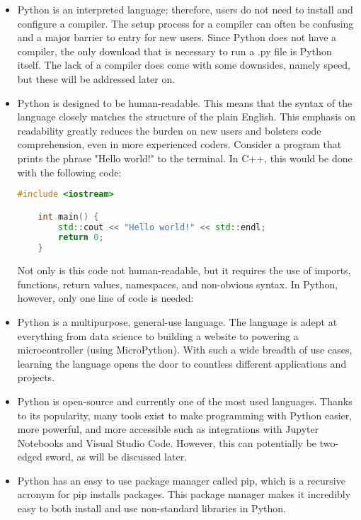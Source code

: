 \begin{itemize}
    \item Python is an interpreted language; therefore, users do not need to install and configure
    a compiler. The setup process for a compiler can often be confusing and a major barrier to entry
    for new users. Since Python does not have a compiler, the only download that is necessary to run 
    a .py file is Python itself. The lack of a compiler does come with some downsides, namely speed,
    but these will be addressed later on.
    \item Python is designed to be human-readable. This means that the syntax of the language closely
    matches the structure of the plain English. This emphasis on readability greatly reduces the
    burden on new users and bolsters code comprehension, even in more experienced coders. Consider 
    a program that prints the phrase "Hello world!"  to the terminal. In C++, this would be done with 
    the following code:

    \begin{lstlisting}[language=C++]
    #include <iostream>

    int main() {
        std::cout << "Hello world!" << std::endl;
        return 0;
    }
    \end{lstlisting}

    Not only is this code not human-readable, but it requires the use of imports, functions, return
    values, namespaces, and non-obvious syntax. In Python, however, only one line of code is needed:

    \-\hspace{1cm} 

    \item Python is a multipurpose, general-use language. The language is adept at everything from
    data science to building a website to powering a microcontroller (using MicroPython). With such 
    a wide breadth of use cases, learning the language opens the door to countless different applications 
    and projects.
    \item Python is open-source and currently one of the most used languages. Thanks to its popularity,
    many tools exist to make programming with Python easier, more powerful, and more accessible such
    as integrations with Jupyter Notebooks and Visual Studio Code. However, this can potentially be 
    two-edged sword, as will be discussed later.
    \item Python has an easy to use package manager called pip, which is a recursive acronym for pip
    installs packages. This package manager makes it incredibly easy to both install and use non-standard
    libraries in Python.
\end{itemize}

